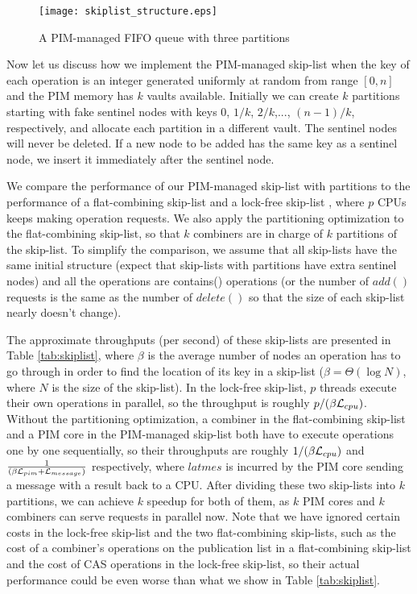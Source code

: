 \begin{figure}[ht!]
\centering
\texttt{[image: skiplist\_structure.eps]}
\caption{A PIM-managed FIFO queue with three partitions}
\label{figure:skiplist_structure}
\end{figure}

Now let us discuss how we implement the PIM-managed skip-list
when the key of each operation is an integer generated uniformly at random
from range $[0, n]$ and the PIM memory has $k$ vaults available.
Initially we can create $k$ partitions starting with fake sentinel nodes
with keys $0$, $1/k$, $2/k$,..., $(n-1)/k$, respectively, 
and allocate each partition in a different vault. 
The sentinel nodes will never be deleted.
If a new node to be added has the same key as a sentinel node,
we insert it immediately after the sentinel node.

We compare the performance of our PIM-managed skip-list with partitions 
to the performance of a flat-combining skip-list \cite{Hendler10}
and a lock-free skip-list \cite{Herlihy08}, 
where $p$ CPUs keeps making operation requests.
We also apply the partitioning optimization to the flat-combining skip-list, 
so that $k$ combiners are in charge of $k$ partitions of the skip-list. 
To simplify the comparison, we assume that all skip-lists have the same
initial structure (expect that skip-lists with partitions have extra sentinel nodes)
and all the operations are contains() operations
(or the number of $add()$ requests is the same as the number of $delete()$ 
so that the size of each skip-list nearly doesn't change).

The approximate throughputs (per second) of these skip-lists are presented in Table \ref{tab:skiplist}, 
where $\beta$ is the average number of nodes an operation has to go through
in order to find the location of its key in a skip-list
($\beta = \Theta(\log N)$, where $N$ is the size of the skip-list).
In the lock-free skip-list, $p$ threads execute their own operations in parallel, 
so the throughput is roughly $p/(\beta\mathcal{L}_{cpu})$. 
Without the partitioning optimization, a combiner in the flat-combining skip-list and a PIM core 
in the PIM-managed skip-list both have to execute operations one by one sequentially, 
so their throughputs are roughly $1 /(\beta\mathcal{L}_{cpu})$ and ${1 \over (\beta\mathcal{L}_{pim} + \mathcal{L}_{message})}$ respectively, 
where $latmes$ is incurred by the PIM core sending a message with a result back to a CPU. 
After dividing these two skip-lists into $k$ partitions, we can achieve $k$ speedup for both of them, 
as $k$ PIM cores and $k$ combiners can serve requests in parallel now. 
Note that we have ignored certain costs in the lock-free skip-list and the two flat-combining skip-lists, 
such as the cost of a combiner's operations on the publication list in a flat-combining skip-list
and the cost of CAS operations in the lock-free skip-list, 
so their actual performance could be even worse than what we show in Table \ref{tab:skiplist}.  

